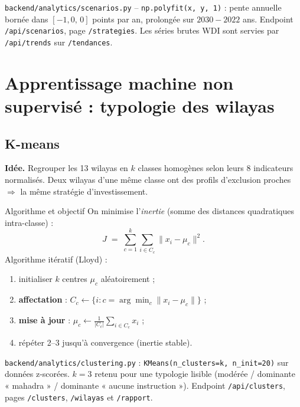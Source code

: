 \documentclass[11pt,a4paper]{article}
\newcommand{\txt}[1]{\texttt{#1}}
\begin{document}
\begin{where}
\txt{backend/analytics/scenarios.py} -- \txt{np.polyfit(x, y, 1)} : pente
annuelle bornée dans $[-1{,}0,\,0]$ points par an, prolongée sur
$\text{2030}-2022$ ans. Endpoint \txt{/api/scenarios}, page \txt{/strategies}.
Les séries brutes WDI sont servies par \txt{/api/trends} sur \txt{/tendances}.
\end{where}

\section{Apprentissage machine non supervisé : typologie des wilayas}

\subsection{K-means}
\label{sec:kmeans}

\textbf{Idée.} Regrouper les 13 wilayas en $k$ classes homogènes selon leurs
8 indicateurs normalisés. Deux wilayas d'une même classe ont des profils
d'exclusion proches $\Rightarrow$ la même stratégie d'investissement.

\begin{meth}{Algorithme et objectif}
On minimise l'\emph{inertie} (somme des distances quadratiques intra-classe) :
\[
J \;=\; \sum_{c=1}^{k}\sum_{i\in C_c}\lVert x_i - \mu_c \rVert^2 .
\]
Algorithme itératif (Lloyd) :
\begin{enumerate}[leftmargin=2em]
  \item initialiser $k$ centres $\mu_c$ aléatoirement ;
  \item \textbf{affectation} : $C_c \gets \{i : c=\arg\min_c \lVert x_i-\mu_c\rVert\}$ ;
  \item \textbf{mise à jour} : $\mu_c \gets \frac{1}{|C_c|}\sum_{i\in C_c} x_i$ ;
  \item répéter 2--3 jusqu'à convergence (inertie stable).
\end{enumerate}
\end{meth}

\begin{where}
\txt{backend/analytics/clustering.py} : \txt{KMeans(n\_clusters=k, n\_init=20)}
sur données z-scorées. $k=3$ retenu pour une typologie lisible (modérée /
dominante « mahadra » / dominante « aucune instruction »). Endpoint
\txt{/api/clusters}, pages \txt{/clusters}, \txt{/wilayas} et \txt{/rapport}.
\end{where}
\end{document}

